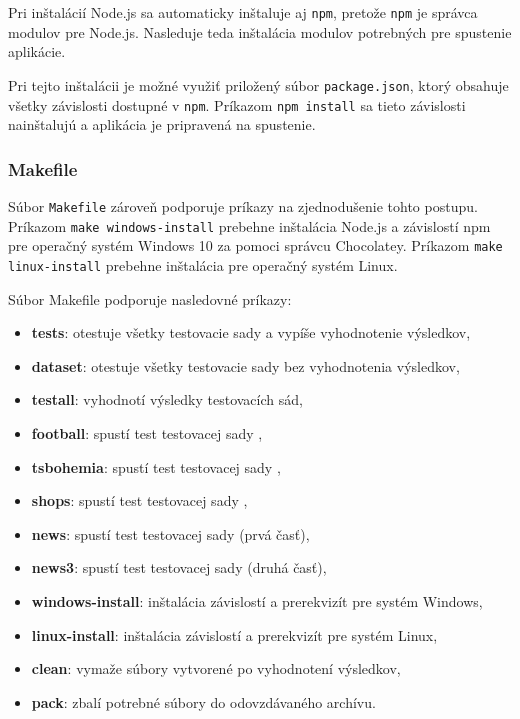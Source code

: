 Pri inštalácií Node.js sa automaticky inštaluje aj \texttt{npm}, pretože \texttt{npm} je správca modulov pre Node.js. Nasleduje teda inštalácia modulov potrebných pre spustenie aplikácie.

Pri tejto inštalácii je možné využiť priložený súbor \texttt{package.json}, ktorý obsahuje všetky závislosti dostupné v \texttt{npm}. Príkazom \texttt{npm install} sa tieto závislosti nainštalujú a aplikácia je pripravená na spustenie.

\newpage

\subsubsection{Makefile}

Súbor \texttt{Makefile} zároveň podporuje príkazy na zjednodušenie tohto postupu. Príkazom \texttt{make windows-install} prebehne inštalácia Node.js a závislostí npm pre operačný systém Windows 10 za pomoci správcu Chocolatey. Príkazom \texttt{make linux-install} prebehne inštalácia pre operačný systém Linux.

Súbor Makefile podporuje nasledovné príkazy:

\begin{itemize}
    \item \textbf{tests}: otestuje všetky testovacie sady a vypíše vyhodnotenie výsledkov,
    \item \textbf{dataset}: otestuje všetky testovacie sady bez vyhodnotenia výsledkov,
    \item \textbf{testall}: vyhodnotí výsledky testovacích sád,
    \item \textbf{football}: spustí test testovacej sady ,
    \item \textbf{tsbohemia}: spustí test testovacej sady ,
    \item \textbf{shops}: spustí test testovacej sady ,
    \item \textbf{news}: spustí test testovacej sady  (prvá časť),
    \item \textbf{news3}: spustí test testovacej sady  (druhá časť),
    \item \textbf{windows-install}: inštalácia závislostí a prerekvizít pre systém Windows,
    \item \textbf{linux-install}: inštalácia závislostí a prerekvizít pre systém Linux,
    \item \textbf{clean}: vymaže súbory vytvorené po vyhodnotení výsledkov,
    \item \textbf{pack}: zbalí potrebné súbory do odovzdávaného archívu.
\end{itemize}

